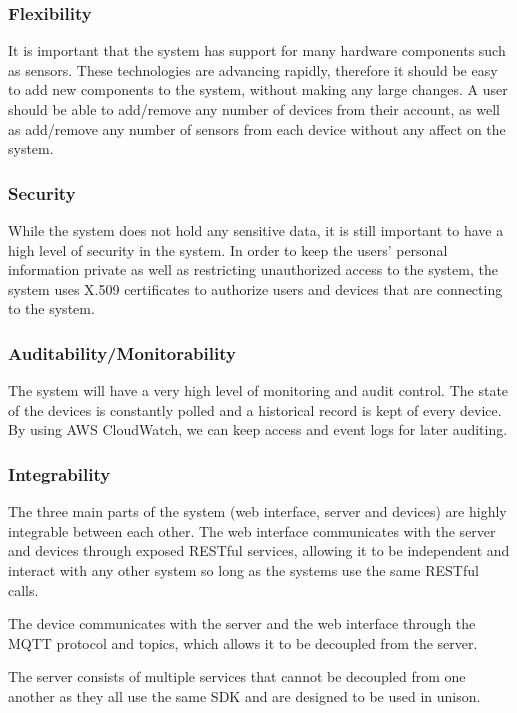 \documentclass{article}
\begin{document}
		\subsubsection{Flexibility}
			It is important that the system has support for many hardware components such as sensors. These technologies are advancing rapidly, therefore it should be easy to add new components to the system, without making any large changes. A user should be able to add/remove any number of devices from their account, as well as add/remove any number of sensors from each device without any affect on the system.
			
		\subsubsection{Security}
			While the system does not hold any sensitive data, it is still important to have a high level of security in the system. In order to keep the users' personal information private as well as restricting unauthorized access to the system, the system uses X.509 certificates to authorize users and devices that are connecting to the system.
			
		\subsubsection{Auditability/Monitorability}
			The system will have a very high level of monitoring and audit control. The state of the devices is constantly polled and a historical record is kept of every device. By using AWS CloudWatch, we can keep access and event logs for later auditing.
			
		\subsubsection{Integrability}
			The three main parts of the system (web interface, server and devices) are highly integrable between each other. The web interface communicates with the server and devices through exposed RESTful services, allowing it to be independent and interact with any other system so long as the systems use the same RESTful calls.
			
			The device communicates with the server and the web interface through the MQTT protocol and topics, which allows it to be decoupled from the server.
			
			The server consists of multiple services that cannot be decoupled from one another as they all use the same SDK and are designed to be used in unison.
\end{document}

